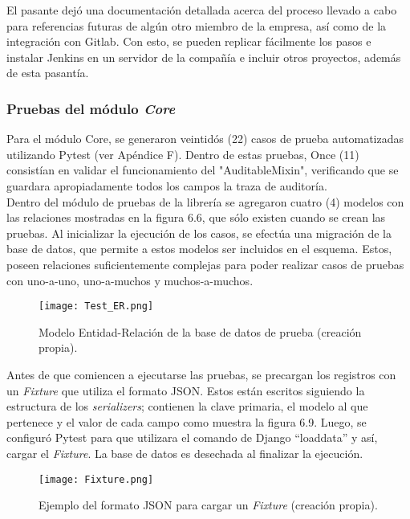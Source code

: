 El pasante dejó una documentación detallada acerca del proceso llevado a cabo para referencias futuras de algún otro miembro de la empresa, así como de la integración con Gitlab. Con esto, se pueden replicar fácilmente los pasos e instalar Jenkins en un servidor de la compañía e incluir otros proyectos, además de esta pasantía.

\subsubsection{Pruebas del módulo \textit{Core}}

Para el módulo Core, se generaron veintidós (22) casos de prueba automatizadas utilizando Pytest (ver Apéndice F). Dentro de estas pruebas, Once (11) consistían en validar el funcionamiento del "AuditableMixin", verificando que se guardara apropiadamente todos los campos la traza de auditoría. \\

Dentro del módulo de pruebas de la librería se agregaron cuatro (4) modelos con las relaciones mostradas en la figura 6.6, que sólo existen cuando se crean las pruebas. Al inicializar la ejecución de los casos, se efectúa una migración de la base de datos, que permite a estos modelos ser incluidos en el esquema. Estos, poseen relaciones suficientemente complejas para poder realizar casos de pruebas con uno-a-uno, uno-a-muchos y muchos-a-muchos.

\begin{figure}[h]
\centering
\texttt{[image: Test\_ER.png]}
\caption{Modelo Entidad-Relación de la base de datos de prueba (creación propia).}
\label{fig:figura6.8}
\end{figure}


Antes de que comiencen a ejecutarse las pruebas, se precargan los registros con un \textit{Fixture} que utiliza el formato JSON.  Estos están escritos siguiendo la estructura de los \textit{serializers}; contienen la clave primaria, el modelo al que pertenece y el valor de cada campo como muestra la figura 6.9. Luego, se configuró Pytest para que utilizara el comando de Django “loaddata” y así, cargar el \textit{Fixture}. La base de datos es desechada al finalizar la ejecución.

\begin{figure}[h]
\centering
\texttt{[image: Fixture.png]}
\caption{Ejemplo del formato JSON para cargar un \textit{Fixture} (creación propia).}
\label{fig:figura6.8}
\end{figure}

